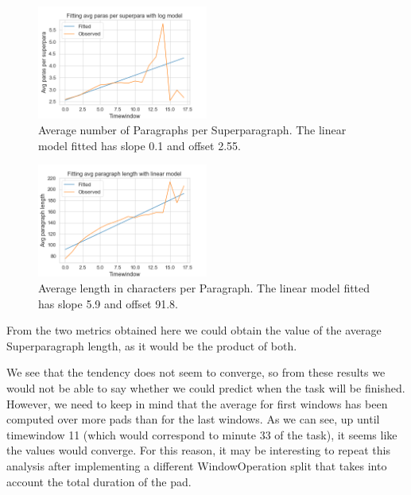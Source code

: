         \begin{figure}[htp!]
            \centering
            \includegraphics[width=0.5\textwidth]{figures/avg_p_sp.png}
            \caption{Average number of Paragraphs per Superparagraph. The linear model fitted has slope 0.1 and offset 2.55.}
            \label{fig:avg_p_sp}
        \end{figure}
        \begin{figure}[htp!]
            \centering
            \includegraphics[width=0.5\textwidth]{figures/avg_len_p.png}
            \caption{Average length in characters per Paragraph. The linear model fitted has slope 5.9 and offset 91.8.}
            \label{fig:avg_len_p}
        \end{figure}
    
    From the two metrics obtained here we could obtain the value of the average Superparagraph length, as it would be the product of both.
    
    We see that the tendency does not seem to converge, so from these results we would not be able to say whether we could predict when the task will be finished. However, we need to keep in mind that the average for first windows has been computed over more pads than for the last windows. As we can see, up until timewindow 11 (which would correspond to minute 33 of the task), it seems like the values would converge. For this reason, it may be interesting to repeat this analysis after implementing a different WindowOperation split that takes into account the total duration of the pad.